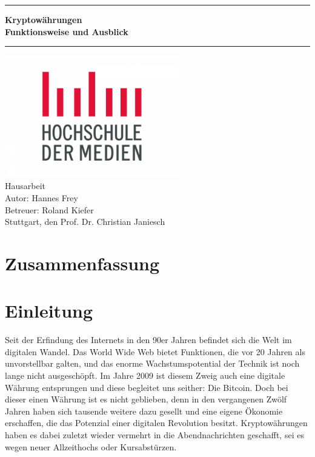 \documentclass[12pt,oneside]{article}
\newcommand{\JMUTitle}[9]{

  \thispagestyle{empty}
  \vspace*{\stretch{1}}
  {\parindent0cm
  \rule{\linewidth}{.7ex}}
  \begin{flushright}
    \vspace*{\stretch{1}}
    \sffamily\bfseries\Huge
    #1\\
    \vspace*{\stretch{1}}
    \sffamily\bfseries\large
    #2
    \vspace*{\stretch{1}}
  \end{flushright}
  \rule{\linewidth}{.7ex}

  \vspace*{\stretch{1}}
  \begin{center}
    \includegraphics[width=3in]{logo} \\
    \vspace*{\stretch{1}}
    \Large Hausarbeit  \\

    \vspace*{\stretch{2}}
   \large Autor: Hannes Frey \\
    \vspace*{\stretch{1}}
    \large Betreuer:  Roland Kiefer \\[1mm]
    
    \vspace*{\stretch{1}}
    \large Stuttgart, den #6
  \end{center}
}
\begin{document}
  \JMUTitle
      {Kryptowährungen }        %
      {Funktionsweise und Ausblick}                        %
      
      {Wirtschaftswissenschaftlichen Fakultät}  %
      {W"urzburg 2018}                          %
      {31.05.2021}                              %
      {Prof. Dr. Christian Janiesch}               %
      {Zweitgutachter}                          %
      {Pr"ufungsdatum}                          %

  \clearpage

\lhead{}
    \setcounter{page}{1}

\tableofcontents
\clearpage

\listoffigures

\listoftables
\clearpage

\section*{Zusammenfassung}
\blindtext
\clearpage




\cleardoublepage
{}  
    \setcounter{page}{1}
\lhead{\nouppercase{\leftmark}}


\section{Einleitung} \label{einleitung}

Seit der Erfindung des Internets in den 90er Jahren befindet sich die Welt im digitalen Wandel. Das World Wide Web bietet Funktionen, die vor 20 Jahren als unvorstellbar galten, und das enorme Wachstumspotential der Technik ist noch lange nicht ausgeschöpft. Im Jahre 2009 ist diesem Zweig auch eine digitale Währung entsprungen und diese begleitet uns seither: Die Bitcoin. 
Doch bei dieser einen Währung ist es nicht geblieben, denn in den vergangenen Zwölf Jahren haben sich tausende weitere dazu gesellt und eine eigene Ökonomie erschaffen, die das Potenzial einer digitalen Revolution besitzt.
Kryptowährungen haben es dabei zuletzt wieder vermehrt in die Abendnachrichten geschafft, sei es wegen neuer Allzeithochs oder Kursabstürzen.\citep{schredder2018}
\end{document}
